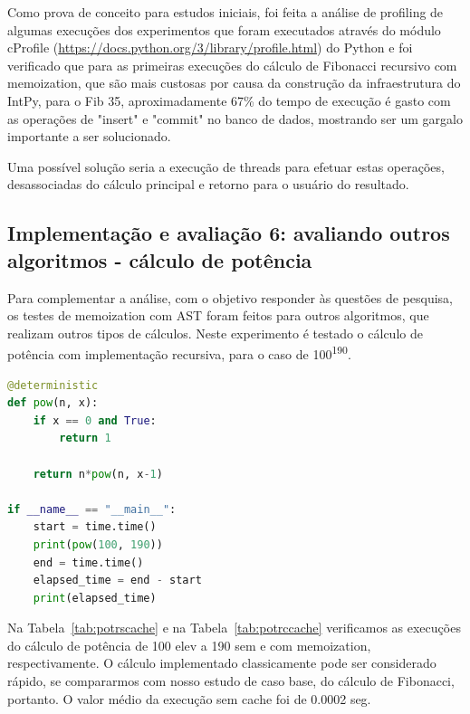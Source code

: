 \documentclass[sigconf]{acmart}
\begin{document}
Como prova de conceito para estudos iniciais, foi feita a análise de profiling de algumas execuções dos experimentos que foram executados através do módulo cProfile (\url{https://docs.python.org/3/library/profile.html}) do Python e foi verificado que para as primeiras execuções do cálculo de Fibonacci recursivo com memoization, que são mais custosas por causa da construção da infraestrutura do IntPy, para o Fib 35, aproximadamente 67\% do tempo de execução é gasto com as operações de "insert" e "commit" no banco de dados, mostrando ser um gargalo importante a ser solucionado.

Uma possível solução seria a execução de threads para efetuar estas operações, desassociadas do cálculo principal e retorno para o usuário do resultado.

\subsection{Implementação e avaliação 6: avaliando outros algoritmos - cálculo de potência}
Para complementar a análise, com o objetivo responder às questões de pesquisa, os testes de memoization com AST foram feitos para outros algoritmos, que realizam outros tipos de cálculos. Neste experimento é testado o cálculo de potência com implementação recursiva, para o caso de 100\textsuperscript{190}.

\renewcommand{\lstlistingname}{Trecho de código}
\begin{lstlisting}[language=Python, caption=Cálculo de potência: 100\textsuperscript{190}]
@deterministic
def pow(n, x):
    if x == 0 and True:
        return 1

    return n*pow(n, x-1)
    
if __name__ == "__main__":
    start = time.time()
    print(pow(100, 190))
    end = time.time()
    elapsed_time = end - start
    print(elapsed_time)
\end{lstlisting}

Na Tabela~\ref{tab:potrscache} e na Tabela~\ref{tab:potrccache} verificamos as execuções do cálculo de potência de 100 elev a 190 sem e com memoization, respectivamente. O cálculo implementado classicamente pode ser considerado rápido, se compararmos com nosso estudo de caso base, do cálculo de Fibonacci, portanto. O valor médio da execução sem cache foi de 0.0002 seg.
\end{document}
